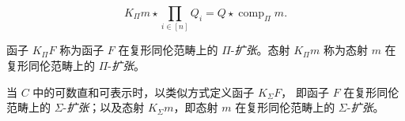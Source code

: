\begin{equation}
  K_{\Pi}m\star\prod_{i\in[n]}Q_i
  =Q\star\operatorname{comp}_{\Pi}m.
  \tag{2.5.10.4}
\end{equation}

函子 $K_{\Pi}F$ 称为函子 $F$ 在复形同伦范畴上的
$\Pi$-\emph{扩张}。态射 $K_{\Pi}m$ 称为态射 $m$
在复形同伦范畴上的 $\Pi$-\emph{扩张}。

当 $C$ 中的可数直和可表示时，以类似方式定义函子 $K_{\Sigma}F$，
即函子 $F$ 在复形同伦范畴上的 $\Sigma$-\emph{扩张}；以及态射
$K_{\Sigma}m$，即态射 $m$ 在复形同伦范畴上的
$\Sigma$-\emph{扩张}。
